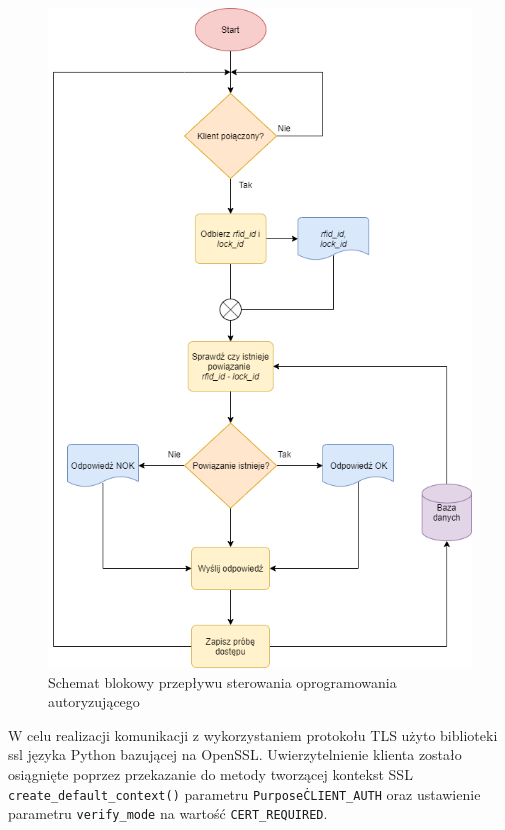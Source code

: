     	\begin{figure}[]
            \centering
            \includegraphics[width=\textwidth]{chapters/images/flowchart5.png}
            \caption{Schemat blokowy przepływu sterowania oprogramowania autoryzującego}
            \label{fig:flowchart5}
        \end{figure}

    	W celu realizacji komunikacji z wykorzystaniem protokołu TLS użyto biblioteki ssl języka Python bazującej na OpenSSL. Uwierzytelnienie klienta zostało osiągnięte poprzez przekazanie do metody tworzącej kontekst SSL \texttt{create\_default\_context()} parametru \texttt{Purpose\.CLIENT\_AUTH} oraz ustawienie parametru \texttt{verify\_mode} na wartość \texttt{CERT\_REQUIRED}.

